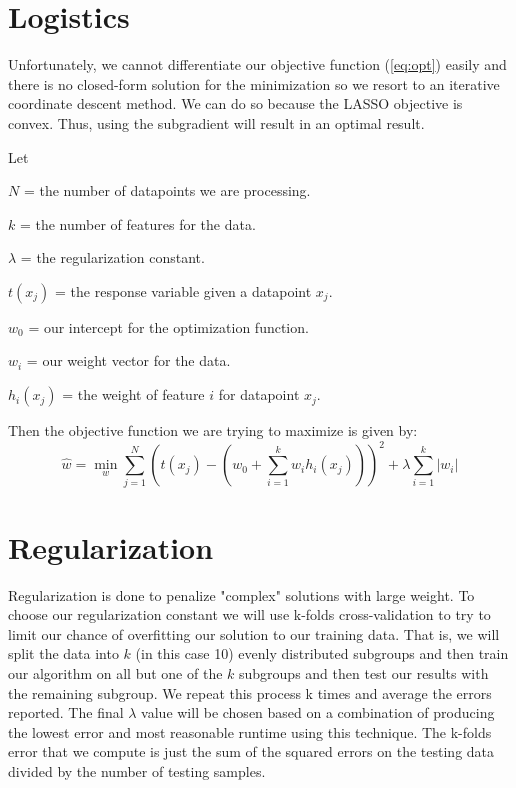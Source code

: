 \documentclass{article}
\begin{document}
\section{Logistics}
\label{Logistics}
Unfortunately, we cannot differentiate our objective function (\ref{eq:opt}) easily and there is no closed-form solution for the minimization so we resort to an iterative coordinate descent method. We can do so because the LASSO objective is convex. Thus, using the subgradient will result in an optimal result.
\begin{description}
\item Let
\item $N$ = the number of datapoints we are processing.
\item $k$ = the number of features for the data.
\item $\lambda$ = the regularization constant.
\item $t({x_j})$ = the response variable given a datapoint ${x_j}$.
\item ${w_0}$ = our intercept for the optimization function.
\item ${w_i}$ = our weight vector for the data.
\item ${h_i}({x_j})$ = the weight of feature $i$ for datapoint ${x_j}$.
\end{description}
Then the objective function we are trying to maximize is given by:
\begin{equation}\label{eq:opt}
{\hat{w}} = \min\limits_{w} \sum_{j=1}^{N} \left(t\left({x_j}\right) - ({w_0} + \sum_{i=1}^{k} {w_i}{h_i}({x_j}))\right)^2 + \lambda\sum_{i=1}^{k} |{w_i}|
\end{equation}
\section{Regularization}
\label{Regularization}
Regularization is done to penalize "complex" solutions with large weight. To choose our regularization constant we will use k-folds cross-validation to try to limit our chance of overfitting our solution to our training data. That is, we will split the data into $k$ (in this case 10) evenly distributed subgroups and then train our algorithm on all but one of the $k$ subgroups and then test our results with the remaining subgroup. We repeat this process k times and average the errors reported. The final $\lambda$ value will be chosen based on a combination of producing the lowest error and most reasonable runtime using this technique. The k-folds error that we compute is just the sum of the squared errors on the testing data divided by the number of testing samples.
\end{document}
